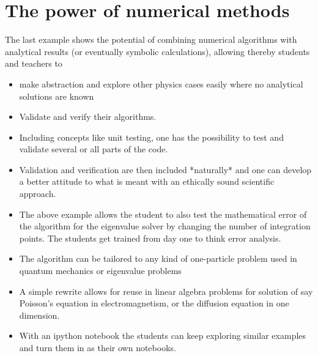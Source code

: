 \section{The power of numerical methods}
The last example shows the potential of combining numerical algorithms with analytical results (or eventually symbolic calculations), allowing thereby students and teachers to

\begin{itemize}
\item make abstraction and explore other physics cases easily where no analytical solutions are known
\item Validate and verify  their  algorithms.
\item Including concepts like unit testing, one has the possibility to test and validate several or all parts of the code.
\item Validation and verification are then included *naturally* and one can develop a better attitude to what is meant with an ethically sound scientific approach.
\item The above example allows the student to also test the mathematical error of the algorithm for the eigenvalue solver by changing the number of integration points. The students get trained from day one to think error analysis.
\item The algorithm can be tailored to any kind of one-particle problem used in quantum mechanics or eigenvalue problems
\item A simple rewrite allows for reuse in linear algebra problems for solution of say Poisson's equation in electromagnetism, or the diffusion equation in one dimension.
\item With an ipython notebook the students can keep exploring similar examples and turn them in as their own notebooks.
\end{itemize}
